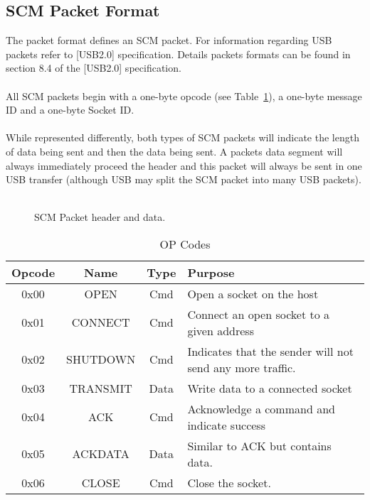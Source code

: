 \documentclass[10pt]{article}
\begin{document}
	\subsection{SCM Packet Format}
	The packet format defines an SCM packet. For information regarding USB packets refer to [USB2.0] specification. Details packets formats can be found in section 8.4 of the [USB2.0] specification. \\
	\\
	All SCM packets begin with a one-byte opcode (see Table~\ref{tab:table1}), a one-byte message ID and a one-byte Socket ID. \\
	\\
	While represented differently, both types of SCM packets will indicate the length of data being sent and then the data being sent. A packets data segment will always immediately proceed the header and this packet will always be sent in one USB transfer (although USB may split the SCM packet into many USB packets). \\
	\\
	\begin{figure}[H]
		\caption[SCM Packet header and data.]{SCM Packet header and data.}
			\centerline {
		} 
	\end{figure}
	\begin{table}[h!]
		\begin{center}
			\caption{OP Codes}
			\label{tab:table1}
			\begin{tabular}{c|c|c|l} 
				\rowcolor{lightgray}
				\textbf{Opcode} &	\textbf{Name} &	\textbf{Type} & \textbf{Purpose}\\
				\hline
				0x00 & OPEN & Cmd & Open a socket on the host\\
				0x01 & CONNECT & Cmd & Connect an open socket to a given address\\
				0x02 & SHUTDOWN & Cmd & Indicates that the sender will not send any more traffic.\\
				0x03 & TRANSMIT & Data & Write data to a connected socket\\
				0x04 & ACK	& Cmd & Acknowledge a command and indicate success\\
				0x05 & ACKDATA	& Data & Similar to ACK but contains data. \\
				0x06 & CLOSE	& Cmd & Close the socket. \\
			\end{tabular}
		\end{center}
	\end{table}
\end{document}
